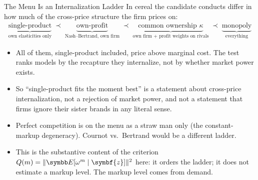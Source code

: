 \documentclass[aspectratio=169,10pt]{beamer}
\begin{document}
\begin{frame}{The Menu Is an Internalization Ladder}
In cereal the candidate conducts differ in \alert{how much of the cross-price structure} the firm prices on:
\begin{align*}
\underbrace{\text{single-product}}_{\text{own elasticities only}} \;\prec\; \underbrace{\text{own-profit}}_{\text{Nash--Bertrand, own firm}} \;\prec\; \underbrace{\text{common ownership } \kappa}_{\text{own firm + profit weights on rivals}} \;\prec\; \underbrace{\text{monopoly}}_{\text{everything}}
\end{align*}
\begin{itemize}
\item \alert{All} of them, single-product included, price above marginal cost. The test ranks models by the recapture they internalize, not by whether market power exists.
\item So ``single-product fits the moment best'' is a statement about \alert{cross-price internalization}, not a rejection of market power, and not a statement that firms ignore their sister brands in any literal sense.
\item Perfect competition is on the menu as a straw man only (the constant-markup degeneracy). Cournot vs.\ Bertrand would be a different ladder.
\item This is the substantive content of the criterion $Q(m) = \|\E[\omega^m \mid \symbf{z}]\|^2$ here: it orders the ladder; it does not estimate a markup level. The markup level comes from demand.
\end{itemize}
\end{frame}
\end{document}
